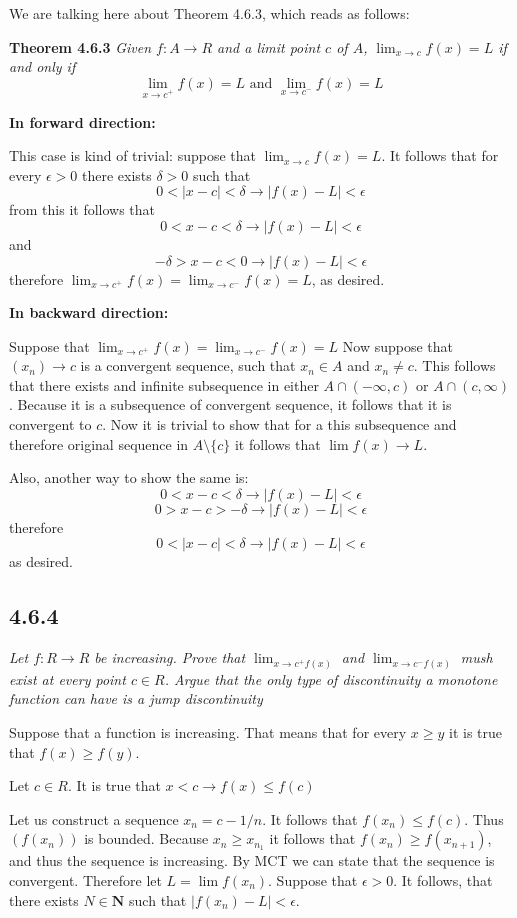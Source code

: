 \documentclass[11pt,oneside,titlepage]{book}
\begin{document}
We are talking here about Theorem 4.6.3, which reads as follows:

\textbf{Theorem 4.6.3}
\textit{Given $f: A \to R$ and a limit point $c$ of $A$,
  $\lim_{x \to c}{f(x)} = L$ if and only if }
$$ \lim_{x \to c^+}{f(x)} = L \text{ and } \lim_{x \to c^-}{f(x)} = L$$

\textbf{In forward direction:}

This case is kind of trivial: suppose that $\lim_{x \to c} f(x) = L$.
It follows that for every $\epsilon > 0$ there exists $\delta > 0$ such that
$$0 < |x - c| < \delta \to |f(x) - L| < \epsilon$$
from this it follows that
$$0 < x - c < \delta \to |f(x) - L| < \epsilon$$
and
$$-\delta > x - c < 0 \to |f(x) - L| < \epsilon$$
therefore $\lim_{x \to c^{+}}{f(x)} = \lim_{x \to c^{-}}{f(x)} = L$,
as desired.

\textbf{In backward direction:}

Suppose that $\lim_{x \to c^{+}}{f(x)} = \lim_{x \to c^{-}}{f(x)} = L$
Now suppose that $(x_n) \to c$ is a convergent sequence, such that
$x_n \in A$ and $x_n \neq c$. This follows that there exists
and infinite subsequence in either  $A \cap (-\infty, c)$ or
$A \cap (c, \infty)$. Because it is a subsequence of convergent
sequence, it follows that it is convergent to $c$. Now it is trivial to show
that for a this subsequence and therefore original sequence in
$A \setminus \{c\}$ it follows that $\lim f(x) \to L$.


Also, another way to show the same is:
$$0 < x - c < \delta  \to |f(x) - L| < \epsilon $$
$$0 > x - c > -\delta \to |f(x) - L| < \epsilon$$
therefore 
$$0 < |x - c| < \delta \to |f(x) - L| < \epsilon$$
as desired.

\subsection*{4.6.4}
\textit{Let $f: R \to R$ be increasing. Prove that $\lim_{x \to c^{+}{f(x)}}$
  and $\lim_{x \to c^{-}{f(x)}}$ mush exist at every point $c \in R$. Argue
  that the only type of discontinuity a monotone function can have is a
  jump discontinuity }

Suppose that a function is increasing. That means that for every  $x \geq y$
it is true that  $f(x) \geq f(y)$. 

Let $c \in R$. It is true that $x < c \to f(x) \leq f(c)$

Let us construct a sequence $x_n = c - 1/n$. It follows that
$f(x_n) \leq f(c)$. Thus $(f(x_n))$ is bounded. Because $x_n \geq x_{n_1}$
it follows that $f(x_n) \geq f(x_{n + 1})$, and thus the sequence is
increasing. By MCT we can state that the sequence is convergent. Therefore
let $L = \lim f(x_n)$. Suppose that
$\epsilon > 0$. It follows, that there exists $N \in \textbf{N}$ such
that $|f(x_n) - L| < \epsilon$.
\end{document}
